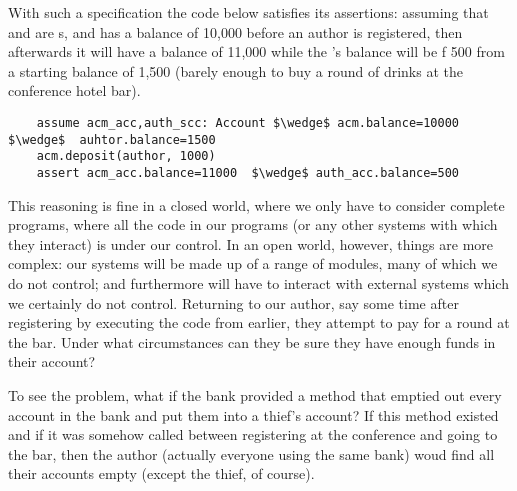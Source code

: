  


With such a specification %
the code below  satisfies its assertions: assuming that 
 and  are s, and   has a balance of 10,000 before an author is
registered, then afterwards it will have a balance of 11,000 while the
's balance  will be f 500 from a starting balance of 1,500
(barely enough to buy a round of drinks at the conference hotel bar).



\begin{lstlisting}
    assume acm_acc,auth_scc: Account $\wedge$ acm.balance=10000 $\wedge$  auhtor.balance=1500
    acm.deposit(author, 1000)
    assert acm_acc.balance=11000  $\wedge$ auth_acc.balance=500
\end{lstlisting}

\vspace{-.2in}

This reasoning is fine in a closed world, where we only have to
consider complete programs, where all the code in our programs (or any
other systems with which they interact) is under our control.   
In an
open world, however, things are more complex: our systems will be made
up of a range of modules, many of which we do not control; and
furthermore will have to interact with external systems which we
certainly do not control.  Returning to our author, say some time
after registering by executing the code from earlier, they
attempt to pay for a round at the bar.  Under what circumstances can
they be sure they have enough funds in their account?

To see the problem, what if the bank provided a  method that 
 emptied out every account in the bank and put  them into a thief's account?
If this method existed and
if it was somehow called between registering at the conference and
going to the bar, then the author (actually everyone using the same bank)
woud find all their accounts empty (except the thief, of course).
%

